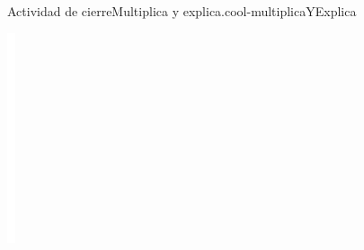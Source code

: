 \documentclass[14pt]{extarticle}
\begin{document}
\begin{project}{Actividad de cierre}{Multiplica y explica.}{cool-multiplicaYExplica}
\begin{image}{0}{1}{0}{}
\includegraphics[max width=\linewidth, center]{external/whitespace-tikz/4cm.pdf}
\end{image}%
\end{project}
\end{document}
